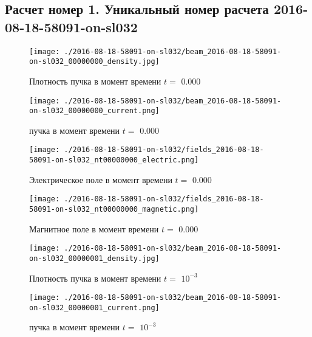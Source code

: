 \documentclass[a4paper,14pt]{extreport}
\begin{document}
 \subsection{Расчет номер 1. Уникальный номер расчета 2016-08-18-58091-on-sl032}
\begin{center}
\begin{figure}[!hbt]
\texttt{[image: ./2016-08-18-58091-on-sl032/beam\_2016-08-18-58091-on-sl032\_00000000\_density.jpg]}
\caption{\label{density_beam0_0} Плотность пучка в момент времени $t = $ 0.000 }
\end{figure}
\end{center}
\begin{center}
\begin{figure}[!hbt]
\texttt{[image: ./2016-08-18-58091-on-sl032/beam\_2016-08-18-58091-on-sl032\_00000000\_current.png]}
\caption{\label{current_beam0_1}  пучка в момент времени $t = $ 0.000 }
\end{figure}
\end{center}
\begin{center}
\begin{figure}[!hbt]
\texttt{[image: ./2016-08-18-58091-on-sl032/fields\_2016-08-18-58091-on-sl032\_nt00000000\_electric.png]}
\caption{\label{electric_0_2} Электрическое поле  в момент времени $t = $ 0.000 }
\end{figure}
\end{center}
\begin{center}
\begin{figure}[!hbt]
\texttt{[image: ./2016-08-18-58091-on-sl032/fields\_2016-08-18-58091-on-sl032\_nt00000000\_magnetic.png]}
\caption{\label{magnetic_0_3} Магнитное поле  в момент времени $t = $ 0.000 }
\end{figure}
\end{center}
\begin{center}
\begin{figure}[!hbt]
\texttt{[image: ./2016-08-18-58091-on-sl032/beam\_2016-08-18-58091-on-sl032\_00000001\_density.jpg]}
\caption{\label{density_beam1_4} Плотность пучка в момент времени $t = $ $10^{-3}$ }
\end{figure}
\end{center}
\begin{center}
\begin{figure}[!hbt]
\texttt{[image: ./2016-08-18-58091-on-sl032/beam\_2016-08-18-58091-on-sl032\_00000001\_current.png]}
\caption{\label{current_beam1_5}  пучка в момент времени $t = $ $10^{-3}$ }
\end{figure}
\end{center}
\end{document}
